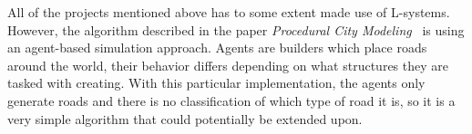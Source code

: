 All of the projects mentioned above has to some extent made use of L-systems.
However, the algorithm described in the paper \textit{Procedural City Modeling}~\cite{citygen_lechner} is using an agent-based simulation approach.
Agents are builders which place roads around the world, their behavior differs depending on what structures they are tasked with creating.
With this particular implementation, the agents only generate roads and there is no classification of which type of road it is, so it is a very simple algorithm that could potentially be extended upon.
